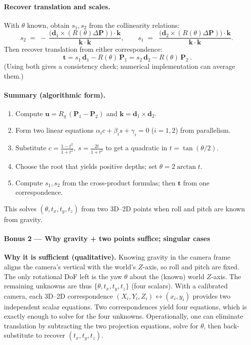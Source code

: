 \documentclass[12pt]{article}
\begin{document}
\paragraph{Recover translation and scales.}
With \(\theta\) known, obtain \(s_1,s_2\) from the collinearity relations:
\[
s_2 \;=\; -\,\frac{\big(\mathbf{d}_1\times (R(\theta)\Delta\mathbf{P})\big)\cdot \mathbf{k}}
{\ \mathbf{k}\cdot\mathbf{k}\ },\qquad
s_1 \;=\;\;\frac{\big(\mathbf{d}_2\times (R(\theta)\Delta\mathbf{P})\big)\cdot \mathbf{k}}
{\ \mathbf{k}\cdot\mathbf{k}\ }.
\]
Then recover translation from either correspondence:
\[
\boxed{\ \mathbf{t}
= s_1\,\mathbf{d}_1 - R(\theta)\,\mathbf{P}_1
= s_2\,\mathbf{d}_2 - R(\theta)\,\mathbf{P}_2\ }.
\]
(Using both gives a consistency check; numerical implementation can average them.)

\paragraph{Summary (algorithmic form).}
\begin{enumerate}
\item Compute \(\mathbf{u}=R_g\,(\mathbf{P}_1-\mathbf{P}_2)\) and \(\mathbf{k}=\mathbf{d}_1\times\mathbf{d}_2\).
\item Form two linear equations \(\alpha_i c+\beta_i s+\gamma_i=0\) (\(i=1,2\)) from parallelism.
\item Substitute \(c=\tfrac{1-t^2}{1+t^2},\ s=\tfrac{2t}{1+t^2}\) to get a quadratic in \(t=\tan(\theta/2)\).
\item Choose the root that yields positive depths; set \(\theta=2\arctan t\).
\item Compute \(s_1,s_2\) from the cross-product formulas; then \(\mathbf{t}\) from one correspondence.
\end{enumerate}
This solves \((\theta,t_x,t_y,t_z)\) from two 3D--2D points when roll and pitch are known from gravity.


\paragraph{Bonus 2 — Why gravity + two points suffice; singular cases}

\textbf{Why it is sufficient (qualitative).}
Knowing gravity in the camera frame aligns the camera’s vertical with the world’s
\(Z\)-axis, so roll and pitch are fixed. The only rotational DoF left is the yaw \(\theta\)
about the (known) world \(Z\)-axis. The remaining unknowns are thus
\(\{\theta,t_x,t_y,t_z\}\) (four scalars).
With a calibrated camera, each 3D--2D correspondence \((X_i,Y_i,Z_i)\leftrightarrow(x_i,y_i)\)
provides two independent scalar equations. Two correspondences yield four equations,
which is exactly enough to solve for the four unknowns. Operationally, one can
eliminate translation by subtracting the two projection equations, solve for \(\theta\),
then back-substitute to recover \((t_x,t_y,t_z)\).
\end{document}
